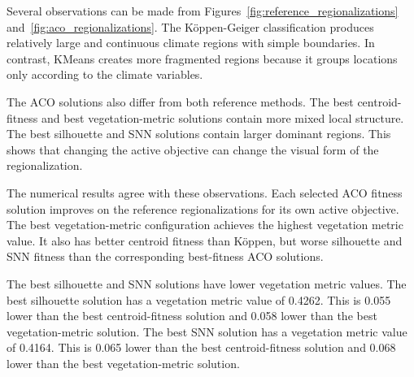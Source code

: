 \documentclass[11pt]{article}
\begin{document}
\begin{table}[H]
\centering
\caption{Comparison of the selected regionalizations.}
\label{tab:regionalization_summary}
\end{table}

Several observations can be made from Figures~\ref{fig:reference_regionalizations} and~\ref{fig:aco_regionalizations}. The Köppen-Geiger classification produces relatively large and continuous climate regions with simple boundaries. In contrast, KMeans creates more fragmented regions because it groups locations only according to the climate variables.

The ACO solutions also differ from both reference methods. The best centroid-fitness and best vegetation-metric solutions contain more mixed local structure. The best silhouette and SNN solutions contain larger dominant regions. This shows that changing the active objective can change the visual form of the regionalization.

The numerical results agree with these observations. Each selected ACO fitness solution improves on the reference regionalizations for its own active objective. The best vegetation-metric configuration achieves the highest vegetation metric value. It also has better centroid fitness than Köppen, but worse silhouette and SNN fitness than the corresponding best-fitness ACO solutions.

The best silhouette and SNN solutions have lower vegetation metric values. The best silhouette solution has a vegetation metric value of 0.4262. This is 0.055 lower than the best centroid-fitness solution and 0.058 lower than the best vegetation-metric solution. The best SNN solution has a vegetation metric value of 0.4164. This is 0.065 lower than the best centroid-fitness solution and 0.068 lower than the best vegetation-metric solution.
\end{document}
